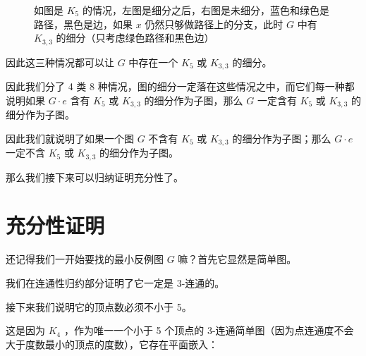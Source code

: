 \documentclass[11pt, a4paper]{ctexart}
\begin{document}
\begin{figure}[H]
    \caption{如图是 $K_5$ 的情况，左图是细分之后，右图是未细分，蓝色和绿色是路径，黑色是边，如果 $x$ 仍然只够做路径上的分支，此时 $G$ 中有 $K_{3,3}$ 的细分（只考虑绿色路径和黑色边）}
\end{figure}

因此这三种情况都可以让 $G$ 中存在一个 $K_5$ 或 $K_{3,3}$ 的细分。

因此我们分了 4 类 8 种情况，图的细分一定落在这些情况之中，而它们每一种都说明如果 $G\cdot e$ 含有 $K_{5}$ 或 $K_{3,3}$ 的细分作为子图，那么 $G$ 一定含有 $K_{5}$ 或 $K_{3,3}$ 的细分作为子图。

因此我们就说明了如果一个图 $G$ 不含有 $K_{5}$ 或 $K_{3,3}$ 的细分作为子图；那么 $G\cdot e$ 一定不含 $K_{5}$ 或 $K_{3,3}$ 的细分作为子图。

那么我们接下来可以归纳证明充分性了。

\section{充分性证明}
还记得我们一开始要找的最小反例图 $G$ 嘛？首先它显然是简单图。

我们在连通性归约部分证明了它一定是 3-连通的。

接下来我们说明它的顶点数必须不小于 5。

这是因为 $K_4$ ，作为唯一一个小于 5 个顶点的 3-连通简单图（因为点连通度不会大于度数最小的顶点的度数），它存在平面嵌入：
\end{document}
